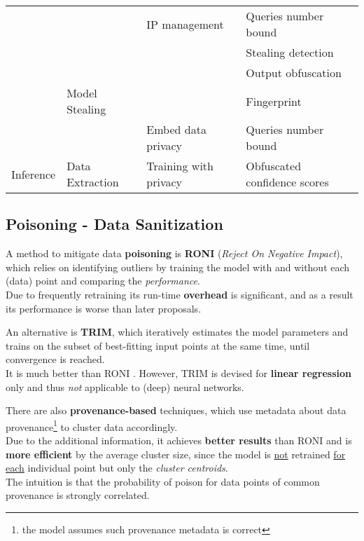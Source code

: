 \begin{table}[ht]
\begin{tabular}{@{}llll@{}}
   & & {IP management}            & {Queries number bound}         \\
   & & & {Stealing detection}           \\
   & & & {Output obfuscation}           \\
   & \multirow{-4}{*}{{Model Stealing}}   & & {Fingerprint}                  \\ \cmidrule(l){2-4} 
   & & {Embed data privacy}       & {Queries number bound}         \\
   \multirow{-9}{*}{{Inference}}                    & \multirow{-2}{*}{{Data Extraction}}  & {Training with privacy}    & {Obfuscated confidence scores} \\ \bottomrule
   \end{tabular}
   \end{table}

\subsection{Poisoning - Data Sanitization}
A method to mitigate data \textbf{poisoning} is \textbf{RONI} (\textit{Reject On Negative Impact}), which relies on identifying outliers by training the model with and without each (data) point and comparing the \textit{performance}.\\
Due to frequently retraining its run-time \textbf{overhead} is significant,
and as a result its performance is worse than later proposals.

An alternative is \textbf{TRIM},
which iteratively estimates the model parameters and trains on the
subset of best-fitting input points at the same time, until convergence is reached.\\
It is much better than RONI \smiley.
However, TRIM is devised for \textbf{linear regression} only and thus \textit{not} applicable to (deep) neural networks.

There are also \textbf{provenance-based} techniques, which use metadata about data provenance\footnote{the model assumes such provenance metadata is correct}
to cluster data accordingly.\\
Due to the additional information, it achieves \textbf{better results} than RONI and
is \textbf{more efficient} by the average cluster size, since the model is \underline{not}
retrained \underline{for each} individual point but only the \textit{cluster centroids}.\\
The intuition is that the probability of poison for data points of common
provenance is strongly correlated.

